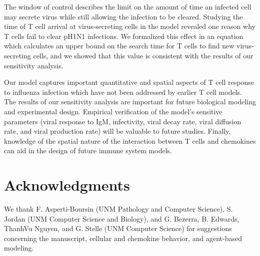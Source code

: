 \documentclass[preprint,10pt,numbers]{elsarticle}
\begin{document}
The window of control describes the limit on the amount of time an infected cell may secrete virus while still allowing the infection to be cleared.  Studying the time of T cell arrival at virus-secreting cells in the model revealed one reason why T cells fail to clear pH1N1 infections.  We formalized this effect in an equation which calculates an upper bound on the search time for T cells to find new virus-secreting cells, and we showed that this value is consistent with the results of our sensitivity analysis.

Our model captures important quantitative and spatial aspects of T cell response to influenza infection which have not been addressed by earlier T cell models.  The results of our sensitivity analysis are important for future biological modeling and experimental design.  Empirical verification of the model's sensitive parameters (viral response to IgM, infectivity, viral decay rate, viral diffusion rate, and viral production rate) will be valuable to future studies.  Finally, knowledge of the spatial nature of the interaction between T cells and chemokines can aid in the design of future immune system models.









\section*{Acknowledgments}

We thank F. Asperti-Boursin (UNM Pathology and Computer Science), S. Jordan (UNM Computer Science and Biology), and G. Bezerra, B. Edwards, ThanhVu Nguyen, and G. Stelle (UNM Computer Science) for suggestions concerning the manuscript, cellular and chemokine behavior, and agent-based modeling.
\end{document}
